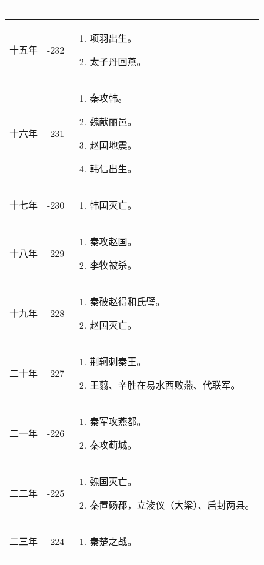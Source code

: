 \begin{longtable}{|>{\centering\scriptsize}m{2em}|>{\centering\scriptsize}m{1.3em}|>{\centering}m{8.8em}|}
\begin{enumerate}
  \end{enumerate} \tabularnewline\hline
  十五年 & -232 & \begin{enumerate}
    \tiny
  \item 项羽出生。
  \item 太子丹回燕。
  \end{enumerate} \tabularnewline\hline
  十六年 & -231 & \begin{enumerate}
    \tiny
  \item 秦攻韩。
  \item 魏献丽邑。
  \item 赵国地震。
  \item 韩信出生。
  \end{enumerate} \tabularnewline\hline
  十七年 & -230 & \begin{enumerate}
    \tiny
  \item 韩国灭亡。
  \end{enumerate} \tabularnewline\hline
  十八年 & -229 & \begin{enumerate}
    \tiny
  \item 秦攻赵国。
  \item 李牧被杀。
  \end{enumerate} \tabularnewline\hline
  十九年 & -228 & \begin{enumerate}
    \tiny
  \item 秦破赵得和氏璧。
  \item 赵国灭亡。
  \end{enumerate} \tabularnewline\hline
  二十年 & -227 & \begin{enumerate}
    \tiny
  \item 荆轲刺秦王。
  \item 王翦、辛胜在易水西败燕、代联军。
  \end{enumerate} \tabularnewline\hline
  二一年 & -226 & \begin{enumerate}
    \tiny
  \item 秦军攻燕都。
  \item 秦攻蓟城。
  \end{enumerate} \tabularnewline\hline
  二二年 & -225 & \begin{enumerate}
    \tiny
  \item 魏国灭亡。
  \item 秦置砀郡，立浚仪（大梁）、启封两县。
  \end{enumerate} \tabularnewline\hline
  二三年 & -224 & \begin{enumerate}
    \tiny
  \item 秦楚之战。

\end{enumerate}
\end{longtable}
